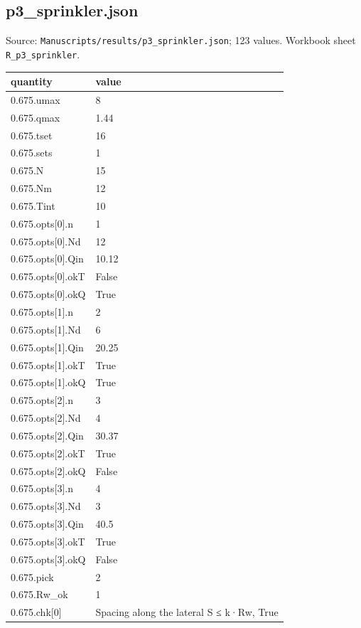\subsection*{p3\_sprinkler.json}
\noindent\small Source: \nolinkurl{Manuscripts/results/p3_sprinkler.json}; 123 values. Workbook sheet \texttt{R\_p3\_sprinkler}.\par
{\scriptsize\begin{longtable}{p{}p{}}\toprule\textbf{quantity} & \textbf{value}\\\midrule\endhead
{}0.675.umax & 8\\
{}0.675.qmax & 1.44\\
{}0.675.tset & 16\\
{}0.675.sets & 1\\
{}0.675.N & 15\\
{}0.675.Nm & 12\\
{}0.675.Tint & 10\\
{}0.675.opts[0].n & 1\\
{}0.675.opts[0].Nd & 12\\
{}0.675.opts[0].Qin & 10.12\\
{}0.675.opts[0].okT & False\\
{}0.675.opts[0].okQ & True\\
{}0.675.opts[1].n & 2\\
{}0.675.opts[1].Nd & 6\\
{}0.675.opts[1].Qin & 20.25\\
{}0.675.opts[1].okT & True\\
{}0.675.opts[1].okQ & True\\
{}0.675.opts[2].n & 3\\
{}0.675.opts[2].Nd & 4\\
{}0.675.opts[2].Qin & 30.37\\
{}0.675.opts[2].okT & True\\
{}0.675.opts[2].okQ & False\\
{}0.675.opts[3].n & 4\\
{}0.675.opts[3].Nd & 3\\
{}0.675.opts[3].Qin & 40.5\\
{}0.675.opts[3].okT & True\\
{}0.675.opts[3].okQ & False\\
{}0.675.pick & 2\\
{}0.675.Rw\_ok & 1\\
{}0.675.chk[0] & Spacing along the lateral S ≤ k·Rw, True\\

\end{longtable}}
